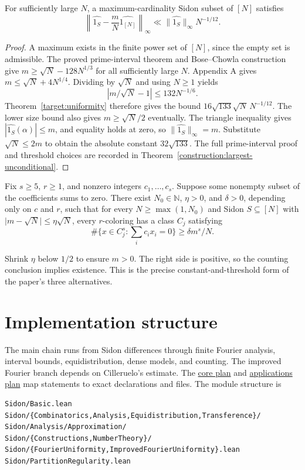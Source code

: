 \begin{corollary}\label{target:largest}
\leanok
For sufficiently large $N$, a maximum-cardinality Sidon subset of $[N]$
satisfies
\[
 \left\|\widehat{1_S}-\frac mN\widehat{1_{[N]}}\right\|_\infty
 \ll \|\widehat{1_S}\|_\infty N^{-1/12}.
\]
\end{corollary}
\begin{proof}
A maximum exists in the finite power set of $[N]$, since the empty set
is admissible. The proved prime-interval theorem and Bose--Chowla
construction give $m\geq\sqrt N-128N^{1/3}$ for all sufficiently large
$N$. Appendix A gives $m\leq\sqrt N+4N^{1/4}$.
Dividing by $\sqrt N$ and using $N\geq1$ yields
\[
 |m/\sqrt N-1|\leq132N^{-1/6}.
\]
Theorem~\ref{target:uniformity} therefore gives the bound
$16\sqrt{133}\sqrt N\,N^{-1/12}$.
The lower size bound also gives $m\geq\sqrt N/2$ eventually.
The triangle inequality gives $|\widehat{1_S}(\alpha)|\leq m$,
and equality holds at zero, so $\|\widehat{1_S}\|_\infty=m$.
Substitute $\sqrt N\leq2m$ to obtain the absolute constant
$32\sqrt{133}$.
The full prime-interval proof and threshold choices are recorded in
Theorem~\ref{construction:largest-unconditional}.
\end{proof}

\begin{theorem}\label{target:partition}
\leanok
{}
Fix $s\geq5$, $r\geq1$, and nonzero integers $c_1,\ldots,c_s$.
Suppose some nonempty subset of the coefficients sums to zero.
There exist $N_0\in\mathbb N$, $\eta>0$, and $\delta>0$, depending
only on $c$ and $r$, such that for every $N\geq\max(1,N_0)$ and Sidon
$S\subseteq[N]$ with $\big|m-\sqrt N\big|\leq\eta\sqrt N$,
every $r$-coloring has a class $C_j$ satisfying
\[
 \#\{x\in C_j^s:\textstyle\sum_i c_ix_i=0\}
 \geq\delta m^s/N.
\]
\end{theorem}
Shrink $\eta$ below $1/2$ to ensure $m>0$. The right side is positive,
so the counting conclusion implies existence. This is the precise
constant-and-threshold form of the paper's three alternatives.

\section{Implementation structure}
The main chain runs from Sidon differences through finite Fourier analysis,
interval bounds, equidistribution, dense models, and counting.
The improved Fourier branch depends on Cilleruelo's estimate.
The \href{https://github.com/TomasOrtega/Sidon/blob/master/docs/core-formalization-plan.md}{core plan}
and \href{https://github.com/TomasOrtega/Sidon/blob/master/docs/applications-formalization-plan.md}{applications plan}
map statements to exact declarations and files. The module structure is
\begin{verbatim}
Sidon/Basic.lean
Sidon/{Combinatorics,Analysis,Equidistribution,Transference}/
Sidon/Analysis/Approximation/
Sidon/{Constructions,NumberTheory}/
Sidon/{FourierUniformity,ImprovedFourierUniformity}.lean
Sidon/PartitionRegularity.lean
\end{verbatim}
